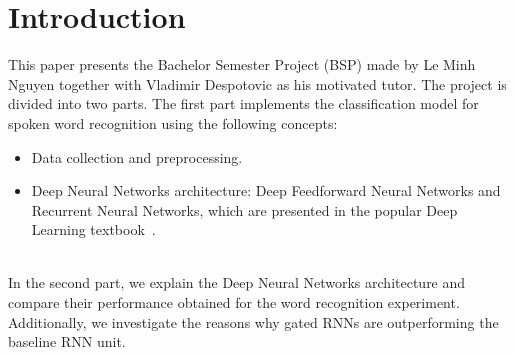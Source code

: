 
\section{Introduction}

This paper presents the Bachelor Semester Project (BSP) made by Le Minh Nguyen
together with Vladimir Despotovic as his motivated tutor. The project is divided
into two parts. The first part implements the classification model for spoken
word recognition using the following concepts:\\

\begin{itemize}
\item Data collection and preprocessing.
\item Deep Neural Networks architecture: Deep Feedforward Neural Networks and
  Recurrent Neural Networks, which are presented in the popular Deep Learning
  textbook~\cite{Goodfellow-et-al-2016}.
\end{itemize}~\\
In the second part, we explain the Deep Neural Networks architecture and compare
their performance obtained for the word recognition experiment. Additionally, we
investigate the reasons why gated RNNs are outperforming the baseline RNN
unit.\\
